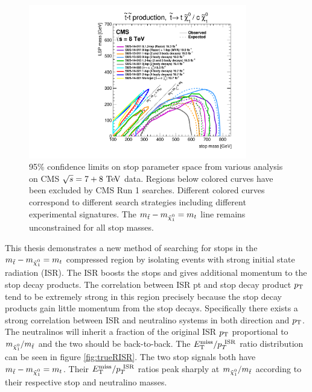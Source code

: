 \begin{figure}[h!]
\centering
    \includegraphics[width=0.85\textwidth, angle=270]{figures/8TeV/T2tt_2015.pdf}\hspace{0.05\textwidth}
\caption[95\% confidence limits on stop parameter space from various analysis on CMS $\sqrt{s} = 7+8 \tev$ data]{ 95\% confidence limits on stop parameter space from various analysis on CMS $\sqrt{s} = 7+8 \tev$ data.  Regions below colored curves have been excluded by CMS Run 1 searches.  Different colored curves correspond to different search strategies including different experimental signatures. The $m_{\stop}-m_{\ninoone} = m_t$ line remains unconstrained for all stop masses.  }
\label{fig:8TeVResult}
\end{figure}


\indent This thesis demonstrates a new method of searching for stops in the $m_{\stop}-m_{\ninoone} = m_t$ compressed region by isolating events with strong initial state radiation (ISR).  The ISR boosts the stops and gives additional momentum to the stop decay products.  The correlation between ISR pt and stop decay product $p_{\mathrm{T}}$ tend to be extremely strong in this region precisely because the stop decay products gain little momentum from the stop decays.  Specifically there exists a strong correlation between ISR and neutralino systems in both direction and $p_{\mathrm{T}}$.  \\

\indent The neutralinos will inherit a fraction of the original ISR $p_{\mathrm{T}}$ proportional to  $m_{\ninoone}/m_{\stop}$ and the two should be back-to-back.  The $E_{\mathrm{T}}^{\mathrm{miss}}/p_{T}^{~\mathrm{ISR}}$ ratio distribution can be seen in figure \ref{fig:trueRISR}.  The two stop signals both have $m_{\stop}-m_{\ninoone} = m_t$.  Their $E_{\mathrm{T}}^{\mathrm{miss}}/p_{T}^{~\mathrm{ISR}}$ ratios peak sharply at $m_{\ninoone}/m_{\stop}$ according to their respective stop and neutralino masses.  \\

